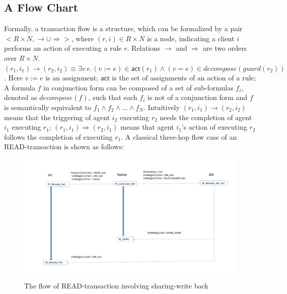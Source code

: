 \documentclass{llncs}
\begin{document}
\subsection{A Flow Chart}
 Formally, a transaction flow is a structure, which can be formalized by a pair $<R \times N, \rightarrow \cup \Rightarrow>$, where $(r,i) \in R \times N$ is a  node, indicating a client $i$ performs an action of executing a rule $r$. Relations  $\rightarrow$  and $\Rightarrow$ are two   orders over $R \times N$. $(r_1,i_1) \rightarrow (r_2,i_2) \equiv \exists v~e. (v:=e) \in \mathsf{act}(r_1) \land (v=e) \in decompose(guard(r_2))$. Here $v:=e$ is an assignment; $\mathsf{act}$ is the set of assignments of an action of a rule; A formula $f$ in conjunction form can be composed of a set of sub-formulas $f_i$, denoted as $decompose(f)$, such that each $f_i$  is not of a conjunction form and $f$ is semantically equivalent to $f_1 \land f_2 \land ... \land f_N$. Intuitively $(r_1,i_1) \rightarrow (r_2,i_2)$ means that the triggering of agent $i_2$ executing $r_2$ needs the completion of agent $i_1$ executing $r_1$; $(r_1,i_1) \Rightarrow (r_2,i_1)$ means that agent $i_1$'s action of executing $r_2$ follows the completion of  executing $r_1$. A classical three-hop flow case of an READ-transaction is shown as follows:


\begin{figure}[htbp]
\centering %
\includegraphics[width=1\textwidth]{flow2.pdf}

\caption{The flow of READ-transaction involving sharing-write back\label{fig:arch}
}
\end{figure}
\end{document}
